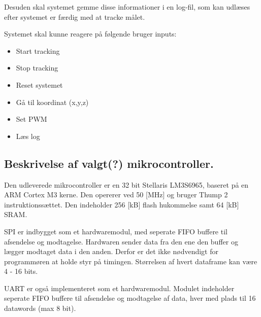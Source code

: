 
Desuden skal systemet gemme disse informationer i en log-fil, som kan udlæses efter systemet er færdig med at tracke målet. 

Systemet skal kunne reagere på følgende bruger inputs:


\begin{itemize}
\itemsep1pt
	\item Start tracking
	\item Stop tracking
	\item Reset systemet
	\item Gå til koordinat (x,y,z)
	\item Set PWM
	\item Læs log
\end{itemize}


\subsection{Beskrivelse af valgt(?) mikrocontroller.}
Den udleverede mikrocontroller er en 32 bit Stellaris LM3S6965, baseret på en ARM Cortex M3 kerne. Den opererer ved 50 [MHz] og bruger Thump 2 instruktionssættet. Den indeholder 256 [kB] flash hukommelse samt 64 [kB] SRAM. 
\citep{lm3s6965}

SPI er indbygget som et hardwaremodul, med seperate FIFO buffere til afsendelse og modtagelse. Hardwaren sender data fra den ene den buffer og lægger modtaget data i den anden. Derfor er det ikke nødvendigt for programmøren at holde styr på timingen. Størrelsen af hvert dataframe kan være 4 - 16 bits. 

UART er også implementeret som et hardwaremodul. Modulet indeholder seperate FIFO buffere til afsendelse og modtagelse af data, hver med plads til 16 datawords (max 8 bit). 




